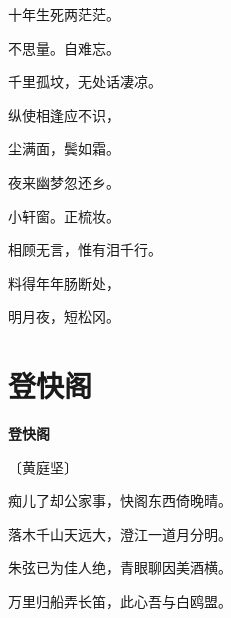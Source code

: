 \documentclass[12pt,UTF-8,openany,fontset=none]{ctexbook}
\begin{document}
    \vspace{18pt}  %

\begin{center}
    \begin{Large}

        十年生死两茫茫。

        不思量。自难忘。

        千里孤坟，无处话凄凉。

        纵使相逢应不识，

        尘满面，鬓如霜。

        \vspace{18pt}  %

        夜来幽梦忽还乡。

        小轩窗。正梳妆。

        相顾无言，惟有泪千行。

        料得年年肠断处，

        明月夜，短松冈。

    \end{Large}

\end{center}

\vspace{8pt}
\clearpage

\section{登快阁}


\begin{center}
    {\bfseries 登快阁}

    \vspace{18pt}

    \begin{large}\xuwen
        〔黄庭坚〕
    \end{large}

\end{center}

    \vspace{18pt}  %

\begin{center}
    \begin{Large}

        痴儿了却公家事，快阁东西倚晚晴。

        落木千山天远大，澄江一道月分明。

        朱弦已为佳人绝，青眼聊因美酒横。

        万里归船弄长笛，此心吾与白鸥盟。

    \end{Large}

\end{center}
\end{document}
